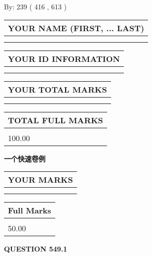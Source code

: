 \documentclass{ctexart}
\begin{document}
   
\hspace{1.0in} By: 
 239 ( 416 ,  613 )
   
   
   
   
\newpage 
\setcounter{page}{ 
   549001 } 
   
   
   
   
\noindent\begin{tabular}{|l|}
\hline
YOUR NAME (FIRST, ... LAST)  \\
\hline
 \\ 
 \\ 
\hline
\end{tabular}
\hspace{0.05in} \begin{tabular}{|l|}
\hline
 YOUR   ID   INFORMATION  \\
\hline
 \\ 
 \\ 
\hline
\end{tabular}
   
   
\vspace{0.2in}\noindent\begin{tabular}{|l|}
\hline
YOUR TOTAL MARKS  \\
\hline
 \\ 
 \\ 
\hline
\end{tabular}
\hspace{0.05in} \begin{tabular}{|l|}
\hline
TOTAL FULL MARKS  \\
\hline
 \\ 
100.00 \\
\hline
\end{tabular}
   
   
 \vspace{0.2in}
{\LARGE {\textbf{ 一个快速卷例}}}
   
   
  
\vspace{0.2in}
  
\noindent\begin{tabular}{|l|}
\hline
 YOUR MARKS  \\
\hline
 \\ 
 \\ 
\hline
\end{tabular}
\hspace{0.05in} \begin{tabular}{|l|}
\hline
 Full Marks  \\
\hline
 \\ 
50.00 \\
\hline
\end{tabular}
{\textbf{\Large{QUESTION
549.1 
}}}
  
\end{document}
